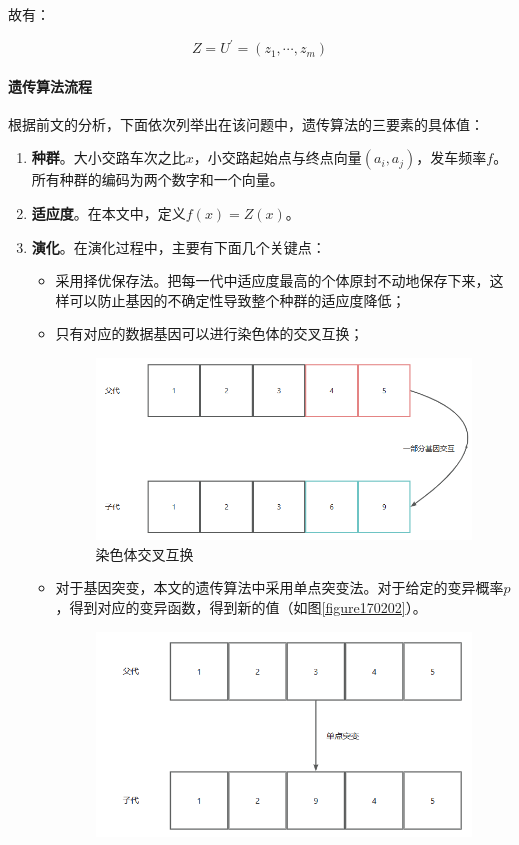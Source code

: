 故有：

\begin{equation}
    Z = U^{'}=(z_1,\cdots,z_m)
\end{equation}

\paragraph{遗传算法流程}

根据前文的分析，下面依次列举出在该问题中，遗传算法的三要素的具体值：

\begin{enumerate}
    \item \textbf{种群}。大小交路车次之比$x$，小交路起始点与终点向量$(a_i, a_j)$，发车频率$f$。所有种群的编码为两个数字和一个向量。
    \item \textbf{适应度}。在本文中，定义$f(x)=Z(x)$。
    \item \textbf{演化}。在演化过程中，主要有下面几个关键点：
    \begin{itemize}
        \item 采用择优保存法。把每一代中适应度最高的个体原封不动地保存下来，这样可以防止基因的不确定性导致整个种群的适应度降低；
        \item 只有对应的数据基因可以进行染色体的交叉互换；
        \begin{figure}[h]
            \centering
            \includegraphics[scale=0.4]{res/figure170220.png}
            \caption{染色体交叉互换}
            \label{figure170220}
        \end{figure}
        \item 对于基因突变，本文的遗传算法中采用单点突变法。对于给定的变异概率$p$，得到对应的变异函数，得到新的值（如图\ref{figure170202}）。
        \begin{figure}[h]
            \centering
            \includegraphics[scale=0.4]{res/figure170202.png}

\end{figure}
\end{itemize}
\end{enumerate}
